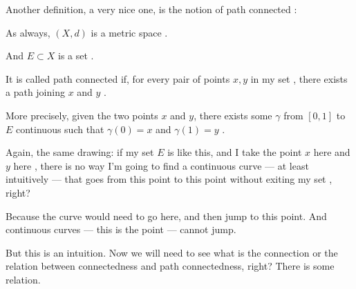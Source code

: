 \begin{speech}[00:35:42 - 00:37:27]
Another definition, a very nice one, is the notion of path connected :

As always, $(X, d)$ is a metric space .

And $E \subset X$ is a set .

It is called path connected  if, for every pair of points $x, y$ in my set , there exists a path joining $x$ and $y$ .

More precisely, given the two points $x$ and $y$, there exists some $\gamma$ from $[0, 1]$ to $E$ continuous  such that $\gamma(0) = x$ and $\gamma(1) = y$ .
\end{speech}

\begin{speech}[00:37:27 - 00:38:25]
Again, the same drawing: if my set $E$ is like this, and I take the point $x$ here and $y$ here , there is no way I'm going to find a continuous curve --- at least intuitively --- that goes from this point to this point without exiting my set , right?

Because the curve would need to go here, and then jump to this point. And continuous curves --- this is the point --- cannot jump.

But this is an intuition. Now we will need to see what is the connection or the relation between connectedness and path connectedness, right? There is some relation.
\end{speech}

